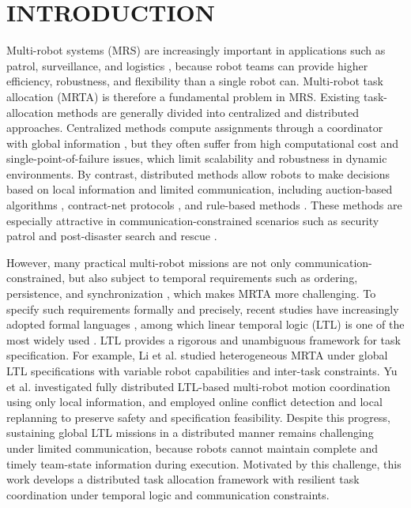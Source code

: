\documentclass[lettersize,journal]{IEEEtran}
\begin{document}
\section{INTRODUCTION}
Multi-robot systems (MRS) are increasingly important in applications such as patrol, surveillance, and logistics \cite{qu2024novel,fang2025multi}, because robot teams can provide higher efficiency, robustness, and flexibility than a single robot can. Multi-robot task allocation (MRTA) is therefore a fundamental problem in MRS. Existing task-allocation methods are generally divided into centralized and distributed approaches. Centralized methods compute assignments through a coordinator with global information \cite{zhou2012task,okubo2022simultaneous}, but they often suffer from high computational cost and single-point-of-failure issues, which limit scalability and robustness in dynamic environments. By contrast, distributed methods allow robots to make decisions based on local information and limited communication, including auction-based algorithms \cite{wang2022consensus,govoni2025decentralized}, contract-net protocols \cite{wang2025multi}, and rule-based methods \cite{maoudj2016distributed}. These methods are especially attractive in communication-constrained scenarios such as security patrol and post-disaster search and rescue \cite{xie2017multi}.

However, many practical multi-robot missions are not only communication-constrained, but also subject to temporal requirements such as ordering, persistence, and synchronization \cite{leahy2016persistent}, which makes MRTA more challenging. To specify such requirements formally and precisely, recent studies have increasingly adopted formal languages \cite{11123780}, among which linear temporal logic (LTL) is one of the most widely used \cite{baier2008principles}. LTL provides a rigorous and unambiguous framework for task specification. For example, Li et al.\cite{li2025task} studied heterogeneous MRTA under global LTL specifications with variable robot capabilities and inter-task constraints. Yu et al.\cite{yu2021distributed} investigated fully distributed LTL-based multi-robot motion coordination using only local information, and employed online conflict detection and local replanning to preserve safety and specification feasibility. Despite this progress, sustaining global LTL missions in a distributed manner remains challenging under limited communication, because robots cannot maintain complete and timely team-state information during execution. Motivated by this challenge, this work develops a distributed task allocation framework with resilient task coordination under temporal logic and communication constraints.
\end{document}
